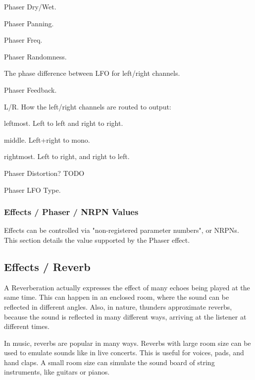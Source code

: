    Phaser Dry/Wet.

   Phaser Panning.

   Phaser Freq.

   Phaser Randomness.

   The phase difference between LFO for left/right channels.

   Phaser Feedback.

   L/R. How the left/right channels are routed to output:

      \begin{enumber}
         \item leftmost. Left to left and right to right.
         \item middle. Left+right to mono.
         \item rightmost. Left to right, and right to left.
      \end{enumber}

   Phaser Distortion? TODO

   Phaser LFO Type.

\subsubsection{Effects / Phaser / NRPN Values}
\label{subsubsec:effects_edit_phaser_nrpn}

Effects can be controlled via "non-registered parameter numbers", or NRPNs.
This section details the value supported by the Phaser effect.

\subsection{Effects / Reverb}
\label{subsec:effects_edit_reverb}

   A Reverberation actually expresses the effect of many echoes being played
   at the same time. This can happen in an enclosed room, where the sound can
   be reflected in different angles. Also, in nature, thunders approximate
   reverbs, because the sound is reflected in many different ways, arriving
   at the listener at different times.

   In music, reverbs are popular in many ways. Reverbs with large room size
   can be used to emulate sounds like in live concerts. This is useful for
   voices, pads, and hand claps. A small room size can simulate the sound
   board of string instruments, like guitars or pianos.

